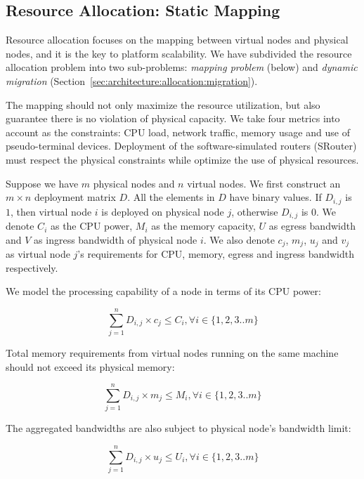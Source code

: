 \documentclass[conference]{IEEEtran}
\begin{document}
\subsection{Resource Allocation: Static Mapping}
\label{sec:architecture:allocation:mapping}

Resource allocation focuses on the mapping between virtual nodes and
physical nodes, and it is the key to platform scalability.
We have subdivided the resource allocation problem into two
sub-problems: \textit{mapping problem} (below) and \textit{dynamic
  migration} (Section~\ref{sec:architecture:allocation:migration}).

The mapping should not only maximize the resource utilization, but
also guarantee there is no violation of physical capacity. We take
four metrics into account as the constraints: CPU load, network
traffic, memory usage and use of pseudo-terminal devices.  Deployment
of the software-simulated routers (SRouter) must respect the physical
constraints while optimize the use of physical resources.


Suppose we have $m$ physical nodes and $n$ virtual nodes.  We first
construct an $m \times n$ deployment matrix $D$. All the elements in
$D$ have binary values.
If $D_{i,j}$ is $1$, then virtual node $i$ is deployed on physical
node $j$, otherwise $D_{i,j}$ is 0. We denote $C_i$ as the CPU power,
$M_i$ as the memory capacity, $U$ as egress bandwidth and $V$ as
ingress bandwidth of physical node $i$. We also denote $c_j$, $m_j$,
$u_j$ and $v_j$ as virtual node $j$'s requirements for CPU, memory,
egress and ingress bandwidth respectively.




We model the processing capability of a node in terms of its CPU
power:

\begin{equation}
  \label{eq:first}
  \sum_{j=1}^{n} D_{i,j} \times c_j \le C_i, \forall i \in \{1, 2, 3 .. m\}
\end{equation}

Total memory requirements from virtual nodes running on the same
machine should not exceed its physical memory:

\begin{equation}
  \sum_{j=1}^{n} D_{i,j} \times m_j \le M_i, \forall i \in \{1, 2, 3 .. m\}
\end{equation}

The aggregated bandwidths are also subject to physical node's
bandwidth limit:

\begin{equation}
  \sum_{j=1}^{n} D_{i,j} \times u_j \le U_i, \forall i \in \{1, 2, 3 .. m\}
\end{equation}
\end{document}
